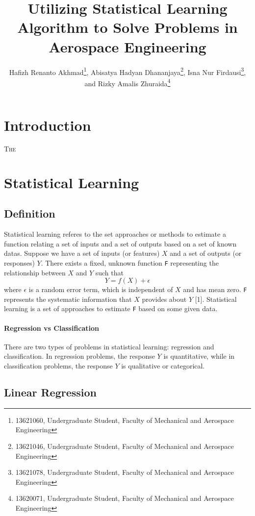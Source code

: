 \documentclass[conf]{new-aiaa}
\title{Utilizing Statistical Learning Algorithm to Solve Problems in Aerospace Engineering}
\author{Hafizh Renanto Akhmad\footnote{13621060, Undergraduate Student, Faculty of Mechanical and Aerospace Engineering}, Abisatya Hadyan Dhananjaya\footnote{13621046, Undergraduate Student, Faculty of Mechanical and Aerospace Engineering}, Isna Nur Firdausi\footnote{13621078, Undergraduate Student, Faculty of Mechanical and Aerospace Engineering}, and Rizky Amalis Zhuraida\footnote{13620071, Undergraduate Student, Faculty of Mechanical and Aerospace Engineering}}
\affil{Institut Teknologi Bandung, Bandung, Jawa Barat, 40132}
\begin{document}
\maketitle

\begin{abstract}
\lipsum[1]
\end{abstract}

\section{Introduction}
\lettrine{T}{he} 

\section{Statistical Learning}
\subsection{Definition}
Statistical learning referes to the set approaches or methods to estimate a function relating a set of inputs and a set of outputs based on a set of known datas. Suppose we have a set of inputs (or features) $X$ and a set of outputs (or responses) $Y$. There exists a fixed, unknown function \texttt{F} representing the relationship between $X$ and $Y$ such that 
\begin{equation} \label{eq:statslearndef}
    Y = f(X) + \epsilon
\end{equation}
where $\epsilon$ is a random error term, which is independent of $X$ and has mean zero. \texttt{F} represents the systematic information that $X$ provides about $Y$ [1]. Statistical learning is a set of approaches to estimate \texttt{F} based on some given data.

\paragraph{Regression vs Classification}
There are two types of problems in statistical learning: regression and classification. In regression problems, the response $Y$ is quantitative, while in classification problems, the response $Y$ is qualitative or categorical.

\subsection{Linear Regression}
\end{document}
